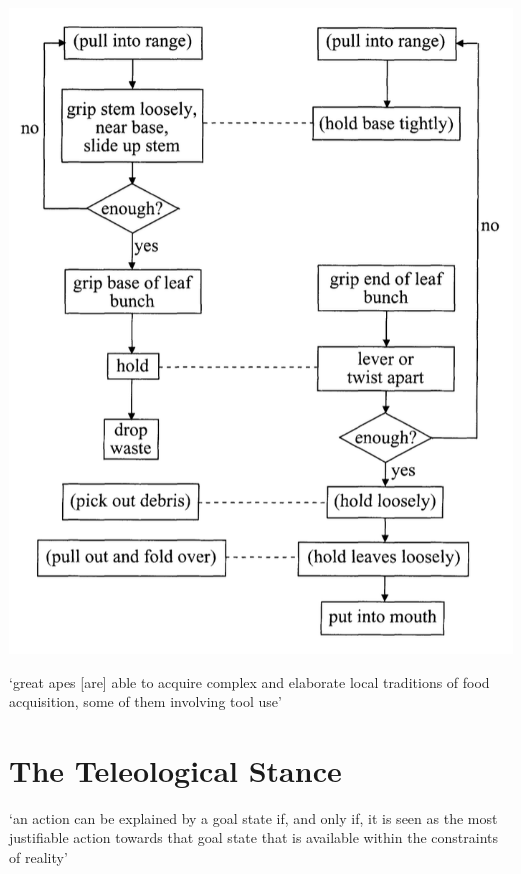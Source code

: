 \documentclass[12pt]{extarticle}
\begin{document}
\begin{multicols*}{3}
\begin{center}
\includegraphics[scale=0.3]{img/byrne_2003_fig1.png}
\end{center}
‘great apes [are] able to acquire complex and elaborate local traditions of food
acquisition, some of them involving tool use’ \citep[p~513]{Byrne:2003wx}
 
 
 
\section{The Teleological Stance}
 
‘an action can be explained by a goal state if, and only if, it is seen as  the  most justifiable action towards that goal state that is available within the constraints of reality’
\citep[p.~255]{Csibra:1998cx}
 
\columnbreak


\end{multicols*}
\end{document}
